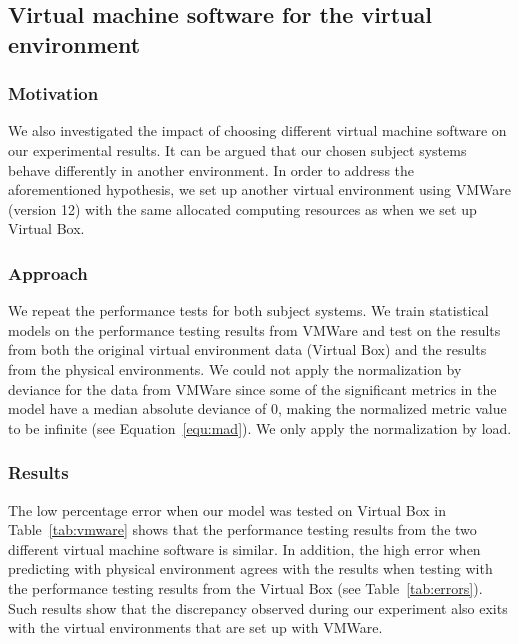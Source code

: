 \subsection{Virtual machine software for the virtual environment}

\subsubsection{Motivation}

We also investigated the impact of choosing different virtual machine software on our experimental results. It can be argued that our chosen subject systems behave differently in another environment. In order to address the aforementioned hypothesis, we set up another virtual environment using VMWare (version 12) with the same allocated computing resources as when we set up Virtual Box.

\subsubsection{Approach}


We repeat the performance tests for both subject systems. We train statistical models on the performance testing results from VMWare and test on the results from both the original virtual environment data (Virtual Box) and the results from the physical environments. We could not apply the normalization by deviance for the data from VMWare since some of the significant metrics in the model have a median absolute deviance of 0, making the normalized metric value to be infinite (see Equation~\ref{equ:mad}). We only apply the normalization by load. 

 \subsubsection{Results}
The low percentage error when our model was tested on Virtual Box in Table~\ref{tab:vmware} shows that the performance testing results from the two different virtual machine software is similar. In addition, the high error when predicting with physical environment agrees with the results when testing with the performance testing results from the Virtual Box (see Table~\ref{tab:errors}). Such results show that the discrepancy observed during our experiment also exits with the virtual environments that are set up with VMWare.

